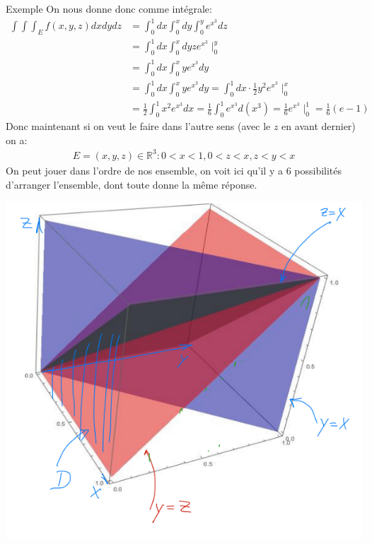 \begin{parag}{Exemple}
	On nous donne donc comme intégrale:
	\begin{align*} 
		\int\int\int_E f(x, y, z)dxdydz &= \int_0^1dx \int_0^x dy \int_0^y e^{x^3}dz\\
						&= \int_0^1 dx \int_0^x dy ze^{x^3}\mid_0^y\\
						&= \int_0^1 dx \int_0^x y e^{x^3}dy \\
						&= \int_0^1 dx \int_0^x y e^{x^3}dy = \int_0^1dx \cdot  \frac{1}{2}y^2 e^{x^3}\mid_0^x\\
						&= \frac{1}{2}\int_0^1x^2 e^{x^3}dx = \frac{1}{6}\int_0^1 e^{x^3}d(x^3) = \frac{1}{6}e^{x^3}\mid_0^1 =  \frac{1}{6}(e-1)
	\end{align*}
	Donc maintenant si on veut le faire dans l'autre sens (avec le $z$ en avant dernier) on a:
	\begin{align*} E = {(x, y, z) \in \mathbb{R}^{3}: 0 < x < 1, 0 < z < x, z < y < x} \end{align*}	
	On peut jouer dans l'ordre de nos ensemble, on voit ici qu'il y a $6$ possibilités d'arranger l'ensemble, dont toute donne la même réponse.
	\begin{center}
	    \includegraphics[scale=0.8]{22025-05-19.png}
	\end{center}
\end{parag}
